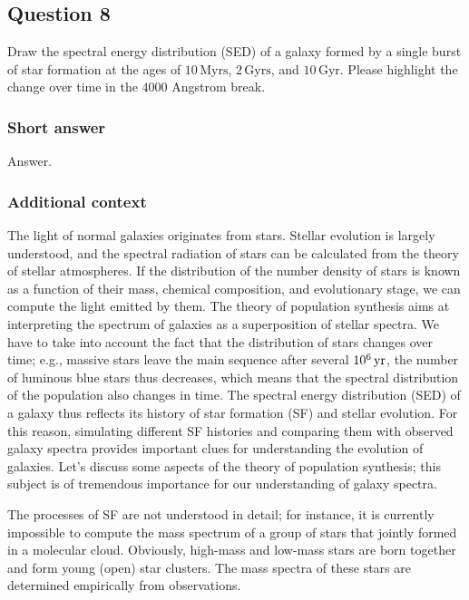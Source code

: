 \documentclass[a4paper,11pt]{article}
\begin{document}

\newpage
\subsection{Question 8}

Draw the spectral energy distribution (SED) of a galaxy formed by a single burst of star formation at the ages of $10\,\mathrm{Myrs}$, $2\,\mathrm{Gyrs}$, and $10\,\mathrm{Gyr}$. Please highlight the change over time in the $4000$ Angstrom break.

\subsubsection{Short answer}

Answer.

\subsubsection{Additional context}

{\noindent}The light of normal galaxies originates from stars. Stellar evolution is largely understood, and the spectral radiation of stars can be calculated from the theory of stellar atmospheres. If the distribution of the number density of stars is known as a function of their mass, chemical composition, and evolutionary stage, we can compute the light emitted by them. The theory of population synthesis aims at interpreting the spectrum of galaxies as a superposition of stellar spectra. We have to take into account the fact that the distribution of stars changes over time; e.g., massive stars leave the main sequence after several $10^6\,{\rm yr}$, the number of luminous blue stars thus decreases, which means that the spectral distribution of the population also changes in time. The spectral energy distribution (SED) of a galaxy thus reflects its history of star formation (SF) and stellar evolution. For this reason, simulating different SF histories and comparing them with observed galaxy spectra provides important clues for understanding the evolution of galaxies. Let's discuss some aspects of the theory of population synthesis; this subject is of tremendous importance for our understanding of galaxy spectra.

{\noindent}The processes of SF are not understood in detail; for instance, it is currently impossible to compute the mass spectrum of a group of stars that jointly formed in a molecular cloud. Obviously, high-mass and low-mass stars are born together and form young (open) star clusters. The mass spectra of these stars are determined empirically from observations.
\end{document}
